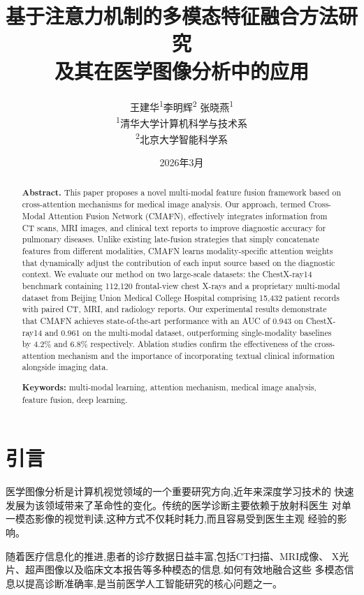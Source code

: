 \documentclass[12pt,a4paper]{article}
\title{基于注意力机制的多模态特征融合方法研究\\
  {\large 及其在医学图像分析中的应用}}
\author{王建华\textsuperscript{1}\quad 李明辉\textsuperscript{2}\quad
  张晓燕\textsuperscript{1}\\[6pt]
  \textsuperscript{1}清华大学计算机科学与技术系\\
  \textsuperscript{2}北京大学智能科学系}
\date{2026年3月}
\theoremstyle{definition}
\begin{document}
\maketitle

\begin{abstract}
\noindent\textbf{Abstract.}
This paper proposes a novel multi-modal feature fusion framework based on
cross-attention mechanisms for medical image analysis. Our approach, termed
Cross-Modal Attention Fusion Network (CMAFN), effectively integrates
information from CT scans, MRI images, and clinical text reports to improve
diagnostic accuracy for pulmonary diseases. Unlike existing late-fusion
strategies that simply concatenate features from different modalities,
CMAFN learns modality-specific attention weights that dynamically adjust
the contribution of each input source based on the diagnostic context.
We evaluate our method on two large-scale datasets: the ChestX-ray14
benchmark containing 112,120 frontal-view chest X-rays and a proprietary
multi-modal dataset from Beijing Union Medical College Hospital comprising
15,432 patient records with paired CT, MRI, and radiology reports. Our
experimental results demonstrate that CMAFN achieves state-of-the-art
performance with an AUC of 0.943 on ChestX-ray14 and 0.961 on the
multi-modal dataset, outperforming single-modality baselines by 4.2\%
and 6.8\% respectively. Ablation studies confirm the effectiveness of
the cross-attention mechanism and the importance of incorporating textual
clinical information alongside imaging data.

\medskip
\noindent\textbf{Keywords:} multi-modal learning, attention mechanism,
medical image analysis, feature fusion, deep learning.
\end{abstract}


\section{引言}

医学图像分析是计算机视觉领域的一个重要研究方向,近年来深度学习技术的
快速发展为该领域带来了革命性的变化。传统的医学诊断主要依赖于放射科医生
对单一模态影像的视觉判读,这种方式不仅耗时耗力,而且容易受到医生主观
经验的影响。

随着医疗信息化的推进,患者的诊疗数据日益丰富,包括CT扫描、MRI成像、
X光片、超声图像以及临床文本报告等多种模态的信息.如何有效地融合这些
多模态信息以提高诊断准确率,是当前医学人工智能研究的核心问题之一。
\end{document}
